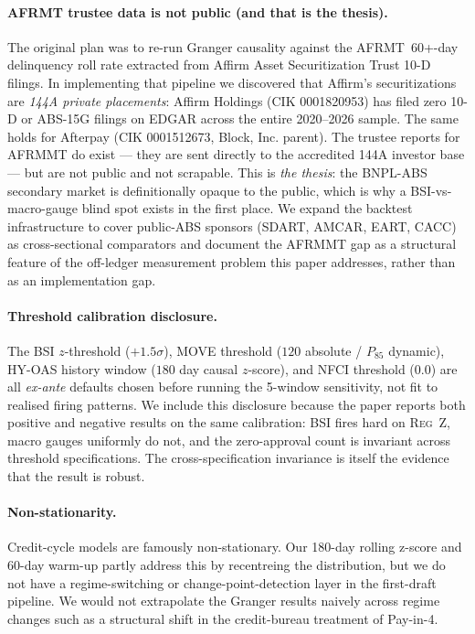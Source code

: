 \documentclass[11pt,letterpaper]{article}
\begin{document}
\paragraph{AFRMT trustee data is not public (and that is the thesis).}
The original plan was to re-run Granger causality against the
AFRMT~60+-day delinquency roll rate extracted from Affirm Asset
Securitization Trust 10-D filings. In implementing that pipeline we
discovered that Affirm's securitizations are \emph{144A private
placements}: Affirm Holdings (CIK 0001820953) has filed zero 10-D or
ABS-15G filings on EDGAR across the entire 2020--2026 sample. The
same holds for Afterpay (CIK 0001512673, Block, Inc. parent). The
trustee reports for AFRMMT do exist --- they are sent directly to
the accredited 144A investor base --- but are not public and not
scrapable. This is \emph{the thesis}: the BNPL-ABS secondary market
is definitionally opaque to the public, which is why a
BSI-vs-macro-gauge blind spot exists in the first place. We expand
the backtest infrastructure to cover public-ABS sponsors (SDART,
AMCAR, EART, CACC) as cross-sectional comparators and document the
AFRMMT gap as a structural feature of the off-ledger measurement
problem this paper addresses, rather than as an implementation gap.

\paragraph{Threshold calibration disclosure.}
The BSI $z$-threshold ($+1.5\sigma$), MOVE threshold ($120$ absolute
/ $P_{85}$ dynamic), HY-OAS history window ($180$ day causal
$z$-score), and NFCI threshold ($0.0$) are all \emph{ex-ante} defaults
chosen before running the 5-window sensitivity, not fit to realised
firing patterns. We include this disclosure because the paper reports
both positive and negative results on the same calibration: BSI fires
hard on \textsc{Reg~Z}, macro gauges uniformly do not, and the
zero-approval count is invariant across threshold specifications.
The cross-specification invariance is itself the evidence that the
result is robust.

\paragraph{Non-stationarity.}
Credit-cycle models are famously non-stationary. Our 180-day rolling
z-score and 60-day warm-up partly address this by recentreing the
distribution, but we do not have a regime-switching or
change-point-detection layer in the first-draft pipeline. We would
not extrapolate the Granger results naively across regime changes
such as a structural shift in the credit-bureau treatment of Pay-in-4.
\end{document}
